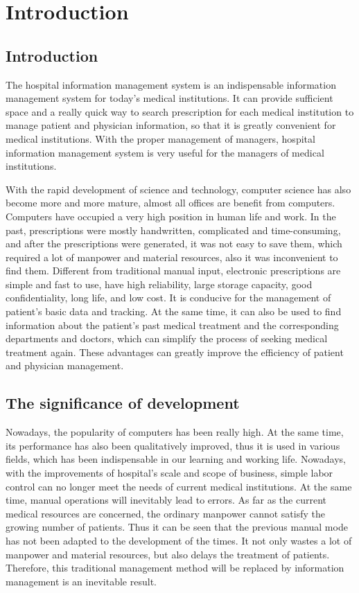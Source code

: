 \section{Introduction}
\subsection{Introduction}

The hospital information management system is an indispensable information management system for today's medical institutions. It can provide sufficient space and a really quick way to search prescription for each medical institution to manage patient and physician information, so that it is greatly convenient for medical institutions. With the proper management of managers, hospital information management system is very useful for the managers of medical institutions.

With the rapid development of science and technology, computer science has also become more and more mature, almost all offices are benefit from computers. Computers have occupied a very high position in human life and work. In the past, prescriptions were mostly handwritten, complicated and time-consuming, and after the prescriptions were generated, it was not easy to save them, which required a lot of manpower and material resources, also it was inconvenient to find them. Different from traditional manual input, electronic prescriptions are simple and fast to use, have high reliability, large storage capacity, good confidentiality, long life, and low cost. It is conducive for the management of patient's basic data and tracking. At the same time, it can also be used to find information about the patient's past medical treatment and the corresponding departments and doctors, which can simplify the process of seeking medical treatment again. These advantages can greatly improve the efficiency of patient and physician management.
\subsection{The significance of development}

Nowadays, the popularity of computers has been really high. At the same time, its performance has also been qualitatively improved, thus it is used in various fields, which has been indispensable in our learning and working life. Nowadays, with the improvements of hospital’s scale and scope of business, simple labor control can no longer meet the needs of current medical institutions. At the same time, manual operations will inevitably lead to errors. As far as the current medical resources are concerned, the ordinary manpower cannot satisfy the growing number of patients. Thus it can be seen that the previous manual mode has not been adapted to the development of the times. It not only wastes a lot of manpower and material resources, but also delays the treatment of patients. Therefore, this traditional management method will be replaced by information management is an inevitable result. 

